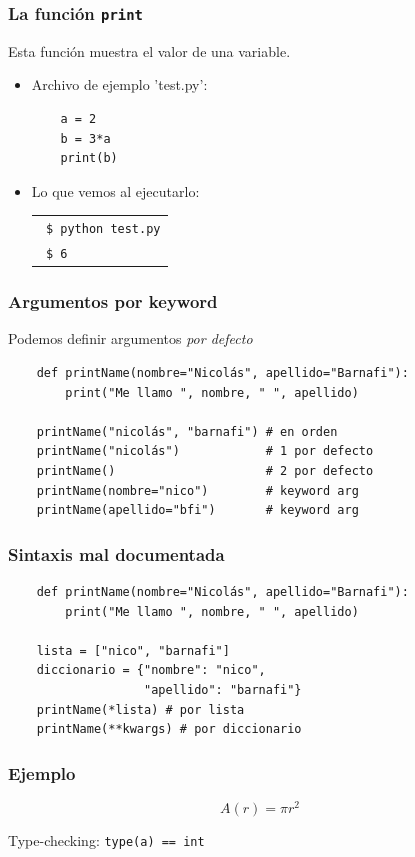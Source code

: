 \documentclass[14pt,aspectratio=169,xcolor=dvipsnames]{beamer}
\begin{document}
\begin{frame}[fragile]\frametitle{La función \texttt{print}}
Esta función muestra el valor de una variable. 
\begin{itemize}
    \item Archivo de ejemplo 'test.py':
    \begin{verbatim}
    a = 2
    b = 3*a
    print(b)
    \end{verbatim}
    \item Lo que vemos al ejecutarlo: 

        \begin{tabular}{l}
            \texttt{ \$ python test.py} \\
            \texttt{ \$ 6}
        \end{tabular}
\end{itemize}

\end{frame}
\begin{frame}[fragile]\frametitle{Argumentos por keyword}
    Podemos definir argumentos \emph{por defecto}
    \begin{verbatim}
    def printName(nombre="Nicolás", apellido="Barnafi"):
        print("Me llamo ", nombre, " ", apellido)

    printName("nicolás", "barnafi") # en orden
    printName("nicolás")            # 1 por defecto
    printName()                     # 2 por defecto
    printName(nombre="nico")        # keyword arg
    printName(apellido="bfi")       # keyword arg
    \end{verbatim}
\end{frame}
\begin{frame}[fragile]\frametitle{Sintaxis mal documentada}
    \begin{verbatim}
    def printName(nombre="Nicolás", apellido="Barnafi"):
        print("Me llamo ", nombre, " ", apellido)

    lista = ["nico", "barnafi"]
    diccionario = {"nombre": "nico", 
                   "apellido": "barnafi"}
    printName(*lista) # por lista
    printName(**kwargs) # por diccionario
    \end{verbatim}

\end{frame}
\begin{frame}\frametitle{Ejemplo}

$$ A(r) = \pi r^2 $$

\vspace{1cm}
\pause Type-checking: \texttt{type(a) == int}
\end{frame}
\end{document}

